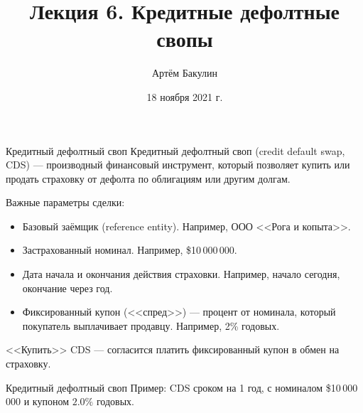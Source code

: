 \documentclass{beamer}
\title{Лекция 6. Кредитные дефолтные свопы}
\author{Артём Бакулин}
\date{18 ноября 2021 г.}
\begin{document}
\begin{frame}
\titlepage
\end{frame}

\begin{frame}{Кредитный дефолтный своп}
\justify
\alert{Кредитный дефолтный своп} (credit default swap, CDS) --- производный финансовый инструмент, который позволяет купить или продать страховку от дефолта по облигациям или другим долгам.

\justify
Важные параметры сделки:
\begin{itemize}
\justifying
\item Базовый заёмщик (reference entity). Например, ООО <<Рога и копыта>>.
\item Застрахованный номинал. Например, \$10\,000\,000.
\item Дата начала и окончания действия страховки. Например, начало сегодня, окончание через год.
\item Фиксированный купон (<<спред>>) --- процент от номинала, который покупатель выплачивает продавцу. Например, 2\% годовых.
\end{itemize}

\justify
<<Купить>> CDS --- согласится платить фиксированный купон в обмен на страховку.
\end{frame}



\newcommand{\swapPartyNode}[5]{

	\draw (#1, #2)
		node[
			rectangle,
			draw,
			rounded corners,
			anchor = south,
			minimum height = 0.8cm,
			minimum width = 2.5cm
		]
		{#5}
	--
	(#3, #4);
}

\newcommand{\swapBuyerPaymentEx}[7]{

	\draw [
		->,
		>=triangle 90
	] 
	(#1, #2)
	node[
		label = left:{#7}
	]{}
	-- (#3, #4)
	node[
		pos=0.5,
		anchor=south
	]
	{#5}
	node[
		pos=0.5,
		anchor=north
	]
	{#6};
}

\newcommand{\swapBuyerPayment}[6]{

	\swapBuyerPaymentEx{#1}{#2}{#3}{#4}{#5}{}{#6}
}

\begin{frame}{Кредитный дефолтный своп}
\justify
Пример: CDS сроком на 1 год, с номиналом \$10\,000\,000 и купоном $2.0\%$ годовых.

\justify
\centering
{}
\end{frame}
\end{document}
